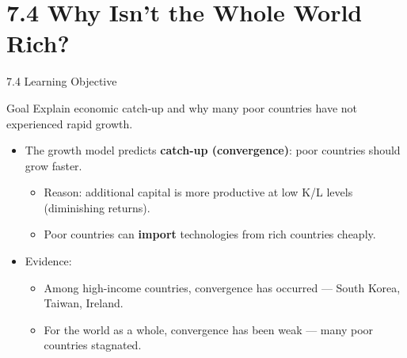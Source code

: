 \documentclass[aspectratio=169]{beamer}
\begin{document}
\section{7.4 Why Isn't the Whole World Rich?}

\begin{frame}{7.4 Learning Objective}
\transfade
\begin{block}{Goal}
Explain economic catch-up and why many poor countries have not experienced rapid growth.
\end{block}
\begin{itemize}[<+->]
  \item The growth model predicts \textbf{catch-up (convergence)}: poor countries should grow faster.
  \begin{itemize}[<+->]
    \item Reason: additional capital is more productive at low K/L levels (diminishing returns).
    \item Poor countries can \textbf{import} technologies from rich countries cheaply.
  \end{itemize}
  \item Evidence:
  \begin{itemize}[<+->]
    \item \alert{Among high-income countries}, convergence has occurred --- South Korea, Taiwan, Ireland.
    \item \alert{For the world as a whole}, convergence has been weak --- many poor countries stagnated.
  \end{itemize}
\end{itemize}
\end{frame}
\end{document}
